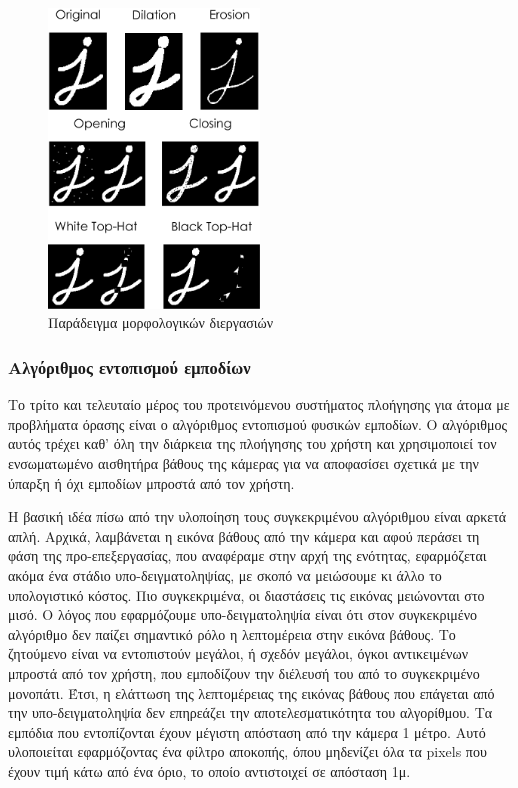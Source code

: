 \begin{figure}[H]
    \centering
    \includegraphics[width=0.5\textwidth]{images/morph_operations.png}
    \caption{Παράδειγμα μορφολογικών διεργασιών}
    \label{fig:morph-operations}
\end{figure}

\subsubsection{Αλγόριθμος εντοπισμού εμποδίων}
Το τρίτο και τελευταίο μέρος του προτεινόμενου συστήματος πλοήγησης για άτομα με προβλήματα όρασης είναι ο αλγόριθμος εντοπισμού φυσικών εμποδίων. Ο αλγόριθμος αυτός τρέχει καθ' όλη την διάρκεια της πλοήγησης του χρήστη και χρησιμοποιεί τον ενσωματωμένο αισθητήρα βάθους της κάμερας για να αποφασίσει σχετικά με την ύπαρξη ή όχι εμποδίων μπροστά από τον χρήστη.

Η βασική ιδέα πίσω από την υλοποίηση τους συγκεκριμένου αλγόριθμου είναι αρκετά απλή. Αρχικά, λαμβάνεται η εικόνα βάθους από την κάμερα και αφού περάσει τη φάση της προ-επεξεργασίας, που αναφέραμε στην αρχή της ενότητας, εφαρμόζεται ακόμα ένα στάδιο υπο-δειγματοληψίας, με σκοπό να μειώσουμε κι άλλο το υπολογιστικό κόστος. Πιο συγκεκριμένα, οι διαστάσεις τις εικόνας μειώνονται στο μισό. Ο λόγος που εφαρμόζουμε υπο-δειγματοληψία είναι ότι στον συγκεκριμένο αλγόριθμο δεν παίζει σημαντικό ρόλο η λεπτομέρεια στην εικόνα βάθους. Το ζητούμενο είναι να εντοπιστούν μεγάλοι, ή σχεδόν μεγάλοι, όγκοι αντικειμένων μπροστά από τον χρήστη, που εμποδίζουν την διέλευσή του από το συγκεκριμένο μονοπάτι. Έτσι, η ελάττωση της λεπτομέρειας της εικόνας βάθους που επάγεται από την υπο-δειγματοληψία δεν επηρεάζει την αποτελεσματικότητα του αλγορίθμου. Τα εμπόδια που εντοπίζονται έχουν μέγιστη απόσταση από την κάμερα 1 μέτρο. Αυτό υλοποιείται εφαρμόζοντας ένα φίλτρο αποκοπής, όπου μηδενίζει όλα τα pixels που έχουν τιμή κάτω από ένα όριο, το οποίο αντιστοιχεί σε απόσταση 1μ.

